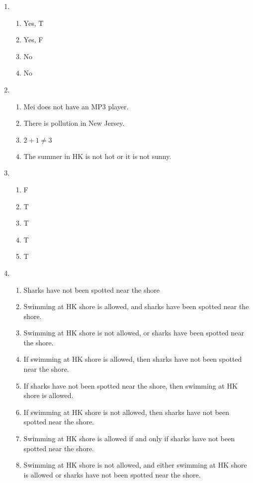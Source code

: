 \documentclass{sig-alternate-05-2015}
\begin{document}
\begin{enumerate}
\item 
\begin{enumerate}
	\item Yes, T
	\item Yes, F
	\item No
	\item No
\end{enumerate}

\item 
\begin{enumerate}
	\item Mei does not have an MP3 player.
	\item There is pollution
	in New Jersey.
	\item $2 + 1 \ne 3$
	\item The summer in HK is not
	hot or it is not sunny.
\end{enumerate}

\item 
\begin{enumerate}
	\item F
	\item T
	\item T
	\item T
	\item T
\end{enumerate}

\item 
\begin{enumerate}
	\item Sharks have
	not been spotted near the shore
	\item Swimming at HK shore is allowed, and sharks have been spotted near the
	shore.
	\item Swimming at HK shore is not allowed,
	or sharks have been spotted near the shore.
	\item If swimming
	at HK shore is allowed, then sharks have not been
	spotted near the shore.
	\item If sharks have not been spotted near
	the shore, then swimming at HK shore is allowed.
	\item If swimming at HK shore is not allowed, then
	sharks have not been spotted near the shore.
	\item Swimming at HK shore is allowed if and only if sharks have
	not been spotted near the shore.
	\item Swimming at HK shore is not allowed, and either swimming at HK shore is allowed or sharks have not been spotted near
	the shore.
\end{enumerate}


\end{enumerate}
\end{document}
